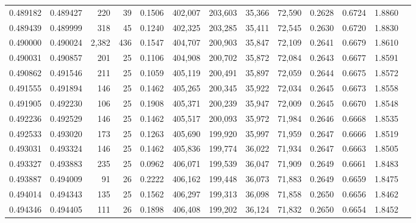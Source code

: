 \begin{tabular}{rrrrrrrrrrrrr}
0.489182 & 0.489427 &   220 &  39 &                                     0.1506 & 402,007 & 203,603 &  35,366 &  72,590 & 0.2628 & 0.6724 & 1.8860 \\
0.489439 & 0.489999 &   318 &  45 &                                     0.1240 & 402,325 & 203,285 &  35,411 &  72,545 & 0.2630 & 0.6720 & 1.8830 \\
0.490000 & 0.490024 & 2,382 & 436 &                                     0.1547 & 404,707 & 200,903 &  35,847 &  72,109 & 0.2641 & 0.6679 & 1.8610 \\
0.490031 & 0.490857 &   201 &  25 &                                     0.1106 & 404,908 & 200,702 &  35,872 &  72,084 & 0.2643 & 0.6677 & 1.8591 \\
0.490862 & 0.491546 &   211 &  25 &                                     0.1059 & 405,119 & 200,491 &  35,897 &  72,059 & 0.2644 & 0.6675 & 1.8572 \\
0.491555 & 0.491894 &   146 &  25 &                                     0.1462 & 405,265 & 200,345 &  35,922 &  72,034 & 0.2645 & 0.6673 & 1.8558 \\
0.491905 & 0.492230 &   106 &  25 &                                     0.1908 & 405,371 & 200,239 &  35,947 &  72,009 & 0.2645 & 0.6670 & 1.8548 \\
0.492236 & 0.492529 &   146 &  25 &                                     0.1462 & 405,517 & 200,093 &  35,972 &  71,984 & 0.2646 & 0.6668 & 1.8535 \\
0.492533 & 0.493020 &   173 &  25 &                                     0.1263 & 405,690 & 199,920 &  35,997 &  71,959 & 0.2647 & 0.6666 & 1.8519 \\
0.493031 & 0.493324 &   146 &  25 &                                     0.1462 & 405,836 & 199,774 &  36,022 &  71,934 & 0.2647 & 0.6663 & 1.8505 \\
0.493327 & 0.493883 &   235 &  25 &                                     0.0962 & 406,071 & 199,539 &  36,047 &  71,909 & 0.2649 & 0.6661 & 1.8483 \\
0.493887 & 0.494009 &    91 &  26 &                                     0.2222 & 406,162 & 199,448 &  36,073 &  71,883 & 0.2649 & 0.6659 & 1.8475 \\
0.494014 & 0.494343 &   135 &  25 &                                     0.1562 & 406,297 & 199,313 &  36,098 &  71,858 & 0.2650 & 0.6656 & 1.8462 \\
0.494346 & 0.494405 &   111 &  26 &                                     0.1898 & 406,408 & 199,202 &  36,124 &  71,832 & 0.2650 & 0.6654 & 1.8452 \\

\end{tabular}

